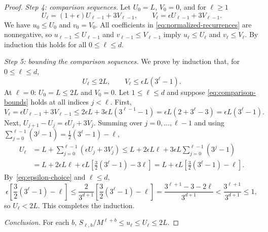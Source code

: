 \documentclass[11pt]{article}
\theoremstyle{definition}
\theoremstyle{remark}
\begin{document}
\begin{proof}
\emph{Step 4: comparison sequences.} Let $U_0=L$, $V_0=0$, and for \(\ell\ge1\)
\[
 U_\ell=(1+\epsilon)U_{\ell-1}+3V_{\ell-1},
 \qquad
 V_\ell=\epsilon U_{\ell-1}+3V_{\ell-1}.
\]
We have \(u_0\le U_0\) and \(v_0=V_0\). All coefficients in \eqref{eq:normalized-recurrences} are nonnegative, so \(u_{\ell-1}\le U_{\ell-1}\) and \(v_{\ell-1}\le V_{\ell-1}\) imply \(u_\ell\le U_\ell\) and \(v_\ell\le V_\ell\). By induction this holds for all \(0\le\ell\le d\).

\emph{Step 5: bounding the comparison sequences.} We prove by induction that, for $0\leq\ell\leq d$,
\begin{equation}
\label{eq:comparison-bounds}
 U_\ell\leq2L,
 \qquad
 V_\ell\leq\epsilon L(3^\ell-1).
\end{equation}
At \(\ell=0\): \(U_0=L\le2L\) and \(V_0=0\).
Let \(1\le\ell\le d\) and suppose \eqref{eq:comparison-bounds} holds at all indices \(j<\ell\).
First,
\[
 V_\ell=\epsilon U_{\ell-1}+3V_{\ell-1}
 \leq 2\epsilon L+3\epsilon L(3^{\ell-1}-1)
 =\epsilon L(2+3^\ell-3)
 =\epsilon L(3^\ell-1).
\]
Next, \(U_{j+1}-U_j=\epsilon U_j+3V_j\). Summing over \(j=0,\ldots,\ell-1\) and using \(\sum_{j=0}^{\ell-1}(3^j-1)=\tfrac12(3^\ell-1)-\ell\),
\begin{align*}
 U_\ell
 &=L+\sum_{j=0}^{\ell-1}(\epsilon U_j+3V_j)
 \leq L+2\epsilon L\ell
          +3\epsilon L\sum_{j=0}^{\ell-1}(3^j-1)\\
 &=L+2\epsilon L\ell+\epsilon L\left[\frac32(3^\ell-1)-3\ell\right]
 =L+\epsilon L\left[\frac32(3^\ell-1)-\ell\right].
\end{align*}
By~\eqref{eq:epsilon-choice} and \(\ell\le d\),
\[
 \epsilon\left[\frac32(3^\ell-1)-\ell\right]
 \leq\frac{2}{3^{d+1}}\left[\frac32(3^\ell-1)-\ell\right]
 =\frac{3^{\ell+1}-3-2\ell}{3^{d+1}}<\frac{3^{\ell+1}}{3^{d+1}}\le1,
\]
so \(U_\ell<2L\). This completes the induction.

\emph{Conclusion.} For each \(b\), \(S_{\ell,b}/M^{\ell+b}\le u_\ell\le U_\ell\le2L\).
\end{proof}
\end{document}
